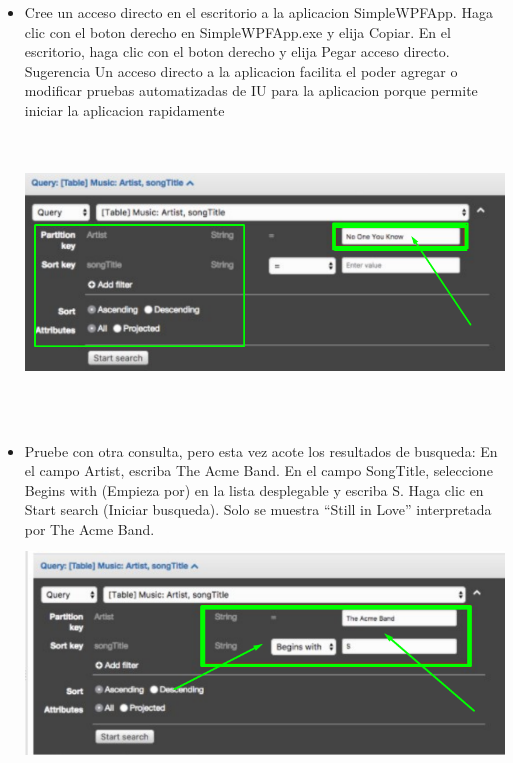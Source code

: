 \documentclass[12pt,a4paper,oneside]{book}
\begin{document}
\begin{itemize}
	\item {Cree un acceso directo en el escritorio a la aplicacion SimpleWPFApp. Haga clic con el boton derecho en SimpleWPFApp.exe y elija Copiar. En el escritorio, haga clic con el boton derecho y elija Pegar acceso directo. Sugerencia Un acceso directo a la aplicacion facilita el poder agregar o modificar pruebas automatizadas de IU para la aplicacion porque permite iniciar la aplicacion rapidamente}\\
	
	\includegraphics[width=16cm, height=8cm]{img/13.png}\\
	
	\item {Pruebe con otra consulta, pero esta vez acote los resultados de busqueda:
		En el campo Artist, escriba The Acme Band. En el campo SongTitle, seleccione Begins with (Empieza por) en la lista desplegable y escriba S. Haga clic en Start search (Iniciar busqueda). Solo se muestra “Still in Love” interpretada por The Acme Band.
}\\
	
	\includegraphics[width=16cm, height=6cm]{img/14.png}\\
	
\end{itemize}
\end{document}
